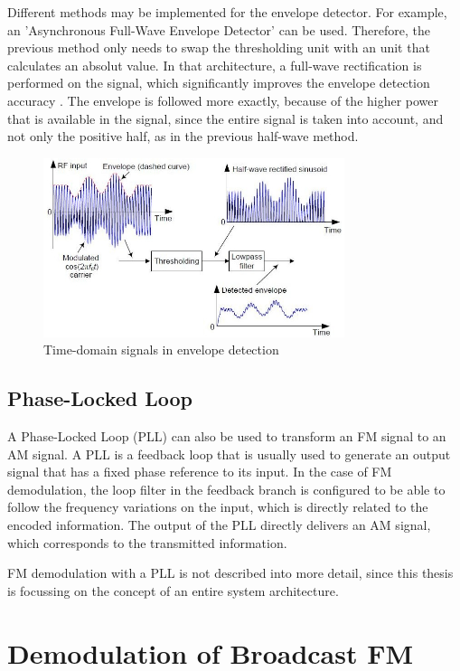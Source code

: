 Different methods may be implemented for the envelope detector.
For example, an 'Asynchronous Full-Wave Envelope Detector' can be used.
Therefore, the previous method only needs to swap the thresholding unit with an unit that calculates an absolut value.
In that architecture, a full-wave rectification is performed on the signal, which significantly improves the envelope detection accuracy \cite{ref_envelope_detector}.
The envelope is followed more exactly, because of the higher power that is available in the signal, since the entire signal is taken into account, and not only the positive half, as in the previous half-wave method.

\begin{figure}[!h]
  \centering
    \includegraphics[width=8.8cm]{img/envelope-detect-time-domain.jpg}
  \caption{Time-domain signals in envelope detection \cite{ref_roppel}}
  \label{fig_time_domain_envelope_detect}
\end{figure}

\subsection{Phase-Locked Loop}

A Phase-Locked Loop (PLL) can also be used to transform an FM signal to an AM signal.
A PLL is a feedback loop that is usually used to generate an output signal that has a fixed phase reference to its input.
In the case of FM demodulation, the loop filter in the feedback branch is configured to be able to follow the frequency variations on the input, which is directly related to the encoded information.
The output of the PLL directly delivers an AM signal, which corresponds to the transmitted information. \cite{ref_schnyder_haller}

FM demodulation with a PLL is not described into more detail, since this thesis is focussing on the concept of an entire system architecture.

\section{Demodulation of Broadcast FM}

